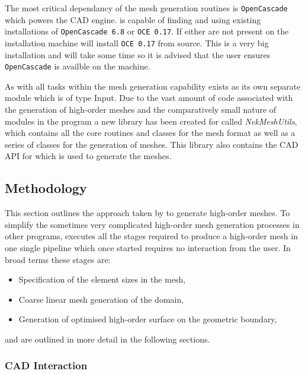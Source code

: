The most critical dependancy of the mesh generation routines is
\texttt{OpenCascade} which powers the CAD engine. \nm is capable of finding and
using existing installations of \texttt{OpenCascade 6.8} or \texttt{OCE 0.17}.
If either are not present on the installation machine \nm will install
\texttt{OCE 0.17} from source. This is a very big installation and will take
some time so it is advised that the user ensures \texttt{OpenCascade} is
availble on the machine.

As with all tasks within \nm the mesh generation capability exists as its
own separate module which is of type Input. Due to the vast amount of code
associated with the generation of high-order meshes and the comparatively small
nature of modules in the \nm program a new library has been created for \nekpp
called {\em NekMeshUtils}, which contains all the core routines and classes for
the \nm mesh format as well as a series of classes for the generation of meshes.
This library also contains the CAD API for \nekpp which is used to generate the
meshes.

\subsection{Methodology}

This section outlines the approach taken by \nm to generate high-order meshes.
%
To simplify the sometimes very complicated high-order mesh generation processes
in other programs, \nm executes all the stages required to produce a high-order
mesh in one single pipeline which once started requires no interaction from the
user. In broad terms these stages are:
\begin{itemize}
	\item Specification of the element sizes in the mesh,
	\item Coarse linear mesh generation of the domain,
	\item Generation of optimised high-order surface on the geometric boundary,
\end{itemize}
%
and are outlined in more detail in the following sections.

\subsubsection{CAD Interaction}

